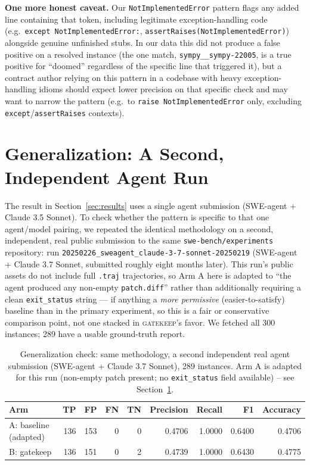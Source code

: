 \documentclass{article}
\begin{document}
\textbf{One more honest caveat.} Our \texttt{NotImplementedError} pattern
flags any added line containing that token, including legitimate
exception-handling code (e.g.\ \texttt{except NotImplementedError:},
\texttt{assertRaises(NotImplementedError)}) alongside genuine unfinished
stubs. In our data this did not produce a false positive on a resolved
instance (the one match, \texttt{sympy\_\_sympy-22005}, is a true positive
for ``doomed'' regardless of the specific line that triggered it), but a
contract author relying on this pattern in a codebase with heavy
exception-handling idioms should expect lower precision on that specific
check and may want to narrow the pattern (e.g.\ to
\texttt{raise NotImplementedError} only, excluding
\texttt{except}/\texttt{assertRaises} contexts).

\section{Generalization: A Second, Independent Agent Run}
\label{sec:generalization}

The result in Section~\ref{sec:results} uses a single agent submission
(SWE-agent + Claude 3.5 Sonnet). To check whether the pattern is specific
to that one agent/model pairing, we repeated the identical methodology on
a second, independent, real public submission to the same
\texttt{swe-bench/experiments} repository: run
\texttt{20250226\_sweagent\_claude-3-7-sonnet-20250219} (SWE-agent + Claude
3.7 Sonnet, submitted roughly eight months later). This run's public
assets do not include full \texttt{.traj} trajectories, so Arm A here is
adapted to ``the agent produced any non-empty \texttt{patch.diff}'' rather
than additionally requiring a clean \texttt{exit\_status} string --- if
anything a \emph{more permissive} (easier-to-satisfy) baseline than in the
primary experiment, so this is a fair or conservative comparison point, not
one stacked in \textsc{gatekeep}'s favor. We fetched all 300 instances; 289
have a usable ground-truth report.

\begin{table}[h]
  \caption{Generalization check: same methodology, a second independent
  real agent submission (SWE-agent + Claude 3.7 Sonnet), 289 instances.
  Arm A is adapted for this run (non-empty patch present; no
  \texttt{exit\_status} field available) -- see Section~\ref{sec:generalization}.}
  \label{tab:ab2}
  \centering
  \small
  \begin{tabular}{lrrrrrrrr}
    \toprule
    Arm & TP & FP & FN & TN & Precision & Recall & F1 & Accuracy \\
    \midrule
    A: baseline (adapted) & 136 & 153 & 0 & 0 & 0.4706 & 1.0000 & 0.6400 & 0.4706 \\
    B: gatekeep            & 136 & 151 & 0 & 2 & 0.4739 & 1.0000 & 0.6430 & 0.4775 \\
    \bottomrule
  \end{tabular}
\end{table}
\end{document}
